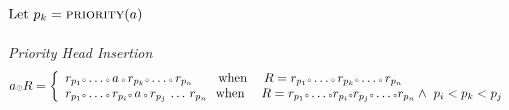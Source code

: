 \noindent
$\text{Let }p_k = \text{\scshape priority}(a) $\\
\\
\hspace{-7mm} \emph{Priority Head Insertion} \\
\begin{equation}
\label{pri_hd_ins}
  a \smodot R = \left \{
    \begin{array}{l}
      r_{p_1}\smcirc\ldots\smcirc\,a\,\smcirc\,r_{p_k}\smcirc\ldots\smcirc\,r_{p_n} 
      \ \ \ \ \ \ \text{when}\ \ \ \ 
      R=r_{p_1}\smcirc\ldots\smcirc\,r_{p_k}\smcirc\ldots\smcirc\,r_{p_n}  \\ 
      r_{p_1}\smcirc\ldots\smcirc\,r_{p_i}\smcirc\,a\,\smcirc\,r_{p_j}\,\ldots\,r_{p_n}
      \ \ \text{when} \  \ \ \ 
      R = r_{p_1}\smcirc\ldots\smcirc r_{p_i}\smcirc
      r_{p_j}\smcirc\ldots\smcirc r_{p_n} \wedge \  p_i < p_k < p_j 
    \end{array} 
  \right.
\end{equation}



